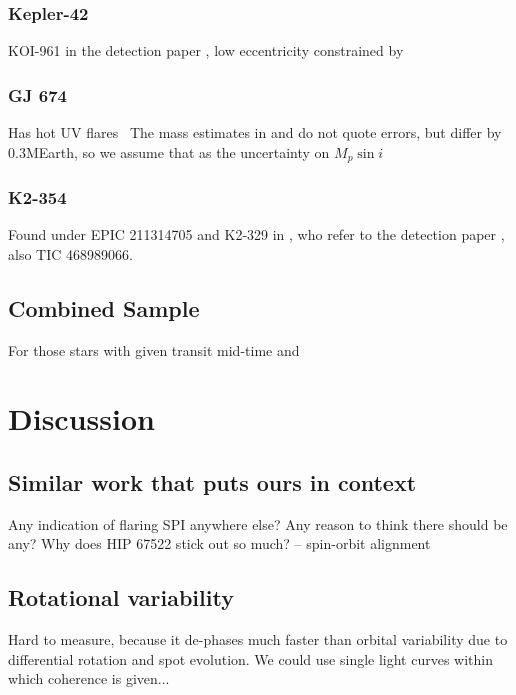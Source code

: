 \documentclass[twocolumn]{aastex631}
\begin{document}
\subsubsection{Kepler-42}
 	KOI-961 in the detection paper \cite{muirhead2012characterizing}, low eccentricity constrained by \cite{mann2017gold}

\subsubsection{GJ 674}
Has hot UV flares~\cite{froning2019hot}
The mass estimates in \cite{bonfils2007harps} and \cite{boisse2011disentangling} do not quote errors, but differ by 0.3MEarth, so we assume that as the uncertainty on $M_p\sin i$

\subsubsection{K2-354}
Found under EPIC 211314705 and K2-329 in \cite{bouma2020cluster}, who refer to the detection paper \cite{pope2016transiting}, also TIC 468989066.






\subsection{Combined Sample}

For those stars with given transit mid-time and 
\section{Discussion}
\label{sec:discussion}

\subsection{Similar work that puts ours in context}

Any indication of flaring SPI anywhere else? Any reason to think there should be any?
Why does HIP 67522 stick out so much? -- spin-orbit alignment

\subsection{Rotational variability}
Hard to measure, because it de-phases much faster than orbital variability due to differential rotation and spot evolution. We could use single light curves within which coherence is given...
\end{document}
